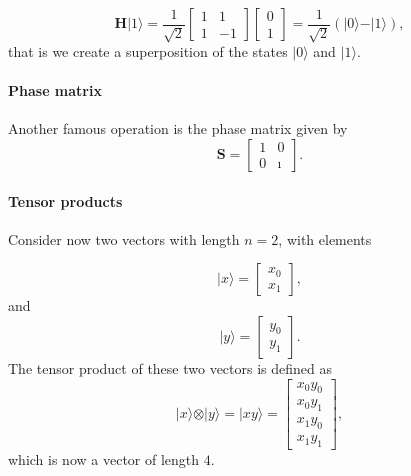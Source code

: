 \[
\bm{H}\vert 1 \rangle = \frac{1}{\sqrt{2}}\begin{bmatrix} 1 & 1 \\ 1 & -1\end{bmatrix}\begin{bmatrix} 0 \\ 1\end{bmatrix}=\frac{1}{\sqrt{2}}(\vert 0\rangle - \vert 1\rangle),
\]
that is we create a superposition of the states $\vert 0\rangle$ and $\vert 1\rangle$.


\paragraph{Phase matrix}
Another famous operation is the phase matrix given by
\[
\bm{S} = \begin{bmatrix} 1 & 0 \\ 0 & \imath\end{bmatrix}.
\]


\paragraph{Tensor products}

Consider now two vectors with length $n=2$, with elements

\[
\vert x \rangle = \begin{bmatrix} x_0 \\ x_1 \end{bmatrix}, 
\]
and
\[
\vert y \rangle = \begin{bmatrix} y_0 \\ y_1 \end{bmatrix}. 
\]
The tensor product of these two vectors is defined as
\[
\vert x \rangle \otimes \vert y \rangle = \vert xy \rangle  = \begin{bmatrix} x_0y_0 \\ x_0y_1 \\ x_1y_0 \\ x_1y_1 \end{bmatrix}, 
\]
which is now a vector of length $4$.


